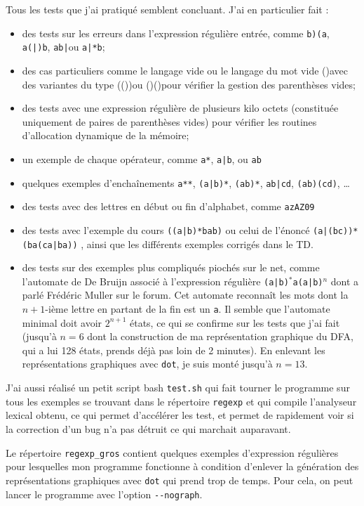 \documentclass[12pt, a4paper]{article}
\begin{document}
Tous les tests que j'ai pratiqué semblent concluant. J'ai en particulier fait :
\begin{itemize}
\item des tests sur les erreurs dans l'expression régulière entrée, comme \og\texttt{b)(a}\fg, \og\texttt{a(|)b}\fg, \og\texttt{ab|}\fg ou \og\texttt{a|*b}\fg;
\item des cas particuliers comme le langage vide \og \fg{} ou le langage du mot vide \og()\fg avec des variantes du type \og(())\fg ou \og()()\fg pour vérifier la gestion des parenthèses vides;
\item des tests avec une expression régulière de plusieurs kilo octets (constituée uniquement de paires de parenthèses vides) pour vérifier les routines d'allocation dynamique de la mémoire;
\item un exemple de chaque opérateur, comme \og\texttt{a*}\fg, \og\texttt{a|b}\fg, ou \og\texttt{ab}\fg
\item quelques exemples d'enchaînements \og\texttt{a**}\fg, \og\texttt{(a|b)*}\fg, \texttt{(ab)*}, \og\texttt{ab|cd}\fg, \og\texttt{(ab)(cd)}\fg, \dots
\item des tests avec des lettres en début ou fin d'alphabet, comme \og\texttt{azAZ09}\fg
\item des tests avec l'exemple du cours \og \texttt{((a|b)*bab)} \fg{} ou celui de l'énoncé \og \texttt{(a|(bc))*(ba(ca|ba))} \fg{}, ainsi que les différents exemples corrigés dans le TD.
\item des tests sur des exemples plus compliqués piochés sur le net, comme l'automate de De Bruijn associé à l'expression régulière \og \texttt{(a|b)$^*$a(a|b)$^n$} \fg{} dont a parlé Frédéric Muller sur le forum. Cet automate  reconnaît les mots dont la $n+1$-ième lettre en partant de la fin est un \texttt{a}. Il semble que l'automate minimal doit avoir $2^{n+1}$ états, ce qui se confirme sur les tests que j'ai fait (jusqu'à $n=6$ dont la construction de ma représentation graphique du DFA, qui a lui 128 états, prends déjà pas loin de 2 minutes). En enlevant les représentations graphiques avec \texttt{dot}, je suis monté jusqu'à $n=13$.
\end{itemize}

J'ai aussi réalisé un petit script bash \texttt{test.sh} qui fait tourner le programme sur tous les exemples se trouvant dans le répertoire \texttt{regexp} et qui compile l'analyseur lexical obtenu, ce qui permet d’accélérer les test, et permet de rapidement voir si la correction d'un bug n'a pas détruit ce qui marchait auparavant.

Le répertoire \texttt{regexp\_gros} contient quelques exemples d'expression régulières pour lesquelles mon programme fonctionne à condition d'enlever la génération des représentations graphiques avec \texttt{dot} qui prend trop de temps. Pour cela, on peut lancer le programme avec l'option \texttt{-{}-nograph}.
\end{document}
